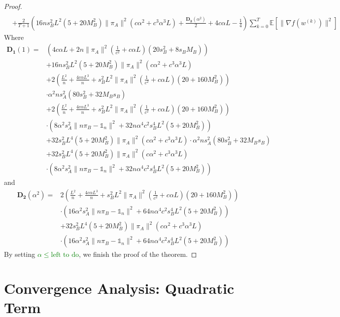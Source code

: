 \documentclass{article}
\newcommand{\EE}[1]{\mathbb{E}\left[#1\right]}
\newcommand{\norm}[1]{\| #1 \|}
\newcommand{\one}{\mathds{1}_n}
\begin{document}
\begin{proof}
\begin{align*}
    \\&+\frac{2}{T+1}\left(16ns_B^2L^2(5+20M_B^2)\norm{\pi_A}^2\left(c\alpha^2+c^3\alpha^3 L\right)+\frac{\mathbf{D_2}(\alpha^2)}{2}+4c\alpha L-\frac{1}{4}\right)\sum_{k=0}^T\EE{\norm{\nabla f(w^{(k)})}^2}
  \end{align*}
  Where 
  \begin{align*}
    \mathbf{D_1}(1)=&\left(4c\alpha L+2n\norm{\pi_A}^2\left(\frac{1}{c^2}+c\alpha L\right)(20s_B^2+8s_BM_B)\right)
    \\&+16ns_B^2L^2(5+20M_B^2)\norm{\pi_A}^2\left(c\alpha^2+c^3\alpha^3 L\right)
    \\&+2\left(\frac{L^2}{n}+\frac{4c\alpha L^3}{n}+s_B^2L^2\norm{\pi_A}^2\left(\frac{1}{c^2}+c\alpha L\right)(20+160M_B^2)\right)
    \\&\cdot\alpha^2 n s_A^2(80s_B^2+32M_Bs_B)
    \\&+2\left(\frac{L^2}{n}+\frac{4c\alpha L^3}{n}+s_B^2L^2\norm{\pi_A}^2\left(\frac{1}{c^2}+c\alpha L\right)(20+160M_B^2)\right)
    \\&\cdot \left(8\alpha^2s_A^2\norm{n\pi_B-\one}^2+32n\alpha^4c^2s_B^4L^2(5+20M_B^2)\right)
    \\&+32s_B^2L^4(5+20M_B^2)\norm{\pi_A}^2\left(c\alpha^2+c^3\alpha^3 L\right)\cdot\alpha^2 n s_A^2(80s_B^2+32M_Bs_B)
    \\&+32s_B^2L^4(5+20M_B^2)\norm{\pi_A}^2\left(c\alpha^2+c^3\alpha^3 L\right)
    \\&\cdot \left(8\alpha^2s_A^2\norm{n\pi_B-\one}^2+32n\alpha^4c^2s_B^4L^2(5+20M_B^2)\right)
  \end{align*}
and 
\begin{align*}
  \mathbf{D_2}(\alpha^2)=&2\left(\frac{L^2}{n}+\frac{4c\alpha L^3}{n}+s_B^2L^2\norm{\pi_A}^2\left(\frac{1}{c^2}+c\alpha L\right)(20+160M_B^2)\right)
  \\&\cdot \left(16\alpha^2s_A^2\norm{n\pi_B-\one}^2+64n\alpha^4c^2s_B^4L^2(5+20M_B^2)\right) 
  \\&+32s_B^2L^4(5+20M_B^2)\norm{\pi_A}^2\left(c\alpha^2+c^3\alpha^3 L\right)
  \\&\cdot \left(16\alpha^2s_A^2\norm{n\pi_B-\one}^2+64n\alpha^4c^2s_B^4L^2(5+20M_B^2)\right) 
\end{align*}
By setting \textcolor{green}{$\alpha \leq \text{left to do}$}, we finish the proof of the theorem.
\end{proof}

\section{Convergence Analysis: Quadratic Term}
\end{document}
